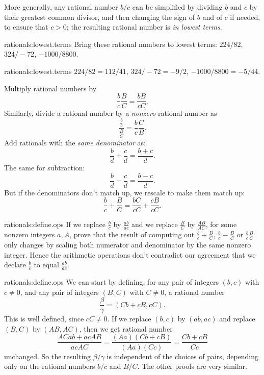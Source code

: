 More generally, any rational number \(b/c\) can be simplified by dividing \(b\) and \(c\) by their greatest common divisor, and then changing the sign of \(b\) and of \(c\) if needed, to ensure that \(c > 0\); the resulting rational number is \emph{in lowest terms}.

\begin{problem}{rationals:lowest.terms}
Bring these rational numbers to lowest terms: \(224/82\), \(324/-72\), \(-\num{1000}/\num{8800}\).
\end{problem}
\begin{answer}{rationals:lowest.terms}
\(224/82=112/41\), \(324/-72=-9/2\), \(-\num{1000}/\num{8800}=-5/44\).
\end{answer}

Multiply rational numbers by
\[
\frac{b}{c} \frac{B}{C} = \frac{bB}{cC}.
\]
Similarly, divide a rational number by a \emph{nonzero} rational number as
\[
\frac{\frac{b}{c}}{\frac{B}{C}} = \frac{b}{c} \frac{C}{B}.
\]
Add rationals with the \emph{same denominator} as:
\[
\frac{b}{d} + \frac{c}{d} = \frac{b+c}{d}.
\]
The same for subtraction:
\[
\frac{b}{d} - \frac{c}{d} = \frac{b-c}{d}.
\]
But if the denominators don't match up, we rescale to make them match up:
\[
\frac{b}{c} + \frac{B}{C} = \frac{bC}{cC} + \frac{cB}{cC}.
\]

\begin{problem}{rationals:define.ops}
If we replace \(\frac{b}{c}\) by \(\frac{ab}{ac}\) and we replace \(\frac{B}{C}\) by \(\frac{AB}{AC}\), for some nonzero integers \(a,A\), prove that the result of computing out \(\frac{b}{c}+\frac{B}{C}\), \(\frac{b}{c}-\frac{B}{C}\) or \(\frac{b}{c}\frac{B}{C}\) only changes by scaling both numerator and denominator by the same nonzero integer.
Hence the arithmetic operations don't contradict our agreement that we declare \(\frac{b}{c}\) to equal \(\frac{ab}{ac}\).
\end{problem}
\begin{answer}{rationals:define.ops}
We can start by defining, for any pair of integers \((b,c)\) with \(c \ne 0\), and any pair of integers \((B,C)\) with \(C \ne 0\), a rational number  
\[
\frac{\beta}{\gamma}=(Cb+cB,cC).
\]
This is well defined, since \(cC \ne 0\).
If we replace \((b,c)\) by \((ab,ac)\) and replace \((B,C)\) by \((AB,AC)\), then we get rational number
\[
\frac{ACab+acAB}{acAC}=\frac{(Aa)(Cb+cB)}{(Aa)(Cc)}=\frac{Cb+cB}{Cc}
\]
unchanged.
So the resulting \(\beta/\gamma\) is independent of the choices of pairs, depending only on the rational numbers \(b/c\) and \(B/C\).
The other proofs are very similar.
\end{answer}

